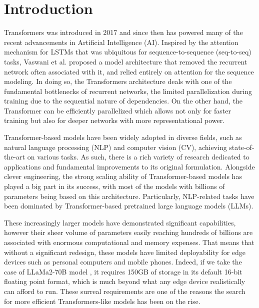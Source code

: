 \section{Introduction}

Transformers \cite{vaswani2023attention} was introduced in 2017 and since then has powered many of the recent advancements in Artificial Intelligence (AI). Inspired by the attention mechanism for LSTMs \cite{10.1162/neco.1997.9.8.1735}\cite{bahdanau2016neural}\cite{luong2015effective}\cite{kim2017structured} that was ubiquitous for sequence-to-sequence (seq-to-seq) tasks,  Vaswani et al. proposed a model architecture that removed the recurrent network often associated with it, and relied entirely on attention for the sequence modeling. In doing so, the Transformers architecture deals with one of the fundamental bottlenecks of recurrent networks, the limited parallelization during training due to the sequential nature of dependencies. On the other hand, the Transformer can be efficiently parallelized which allows not only for faster training but also for deeper networks with more representational power.


Transformer-based models have been widely adopted in diverse fields,
such as natural language processing (NLP) and computer vision (CV), achieving state-of-the-art on various tasks. As such, there is a rich variety of research dedicated to applications and fundamental improvements to its original formulation. Alongside clever engineering, the strong scaling ability of Transformer-based models has played a big part in its success, with most of the models with billions of parameters being based on this architecture. Particularly, NLP-related tasks have been dominated by Transformer-based pretrained large language models (LLMs).

These increasingly larger models have demonstrated significant capabilities, however their sheer volume of parameters easily reaching hundreds of billions are associated with enormous computational and memory expenses. That means that without a significant redesign, these models have limited deployability for edge devices such as personal computers and mobile phones. Indeed, if we take the case of LLaMa2-70B model \cite{touvron2023llama}, it requires 150GB of storage in its default 16-bit floating point format, which is much beyond what any edge device realistically can afford to run. These surreal requirements are one of the reasons the search for more efficient Transformers-like models has been on the rise.

